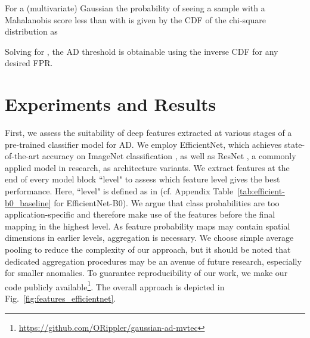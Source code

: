 \documentclass[conference, a4paper]{./template/IEEEtran}
\begin{document}
For a (multivariate) Gaussian the probability of seeing a sample with a Mahalanobis score less than  with  is given by the CDF  of the chi-square distribution as
 

Solving for , the AD threshold is obtainable using the inverse CDF for any desired FPR.



\section{Experiments and Results}

First, we assess the suitability of deep features extracted at various stages of a pre-trained classifier model for AD. We employ EfficientNet, which achieves state-of-the-art accuracy on ImageNet classification \cite{Tan2019}, as well as ResNet \cite{He2016}, a commonly applied model in research, as architecture variants.
We extract features at the end of every model block ``level" to assess which feature level gives the best performance.
Here, ``level" is defined as in \cite{Tan2019,He2016} (cf. Appendix Table~\ref{tab:efficient-b0_baseline} for EfficientNet-B0). We argue that class probabilities are too application-specific and therefore make use of the features before the final mapping in the highest level.
As feature probability maps may contain spatial dimensions in earlier levels, aggregation is necessary.
We choose simple average pooling to reduce the complexity of our approach, but it should be noted that dedicated aggregation procedures may be an avenue of future research, especially for smaller anomalies.
To guarantee reproducibility of our work, we make our code publicly available\footnote{\url{https://github.com/ORippler/gaussian-ad-mvtec}}.
The overall approach is depicted in Fig.~\ref{fig:features_efficientnet}.
\end{document}
